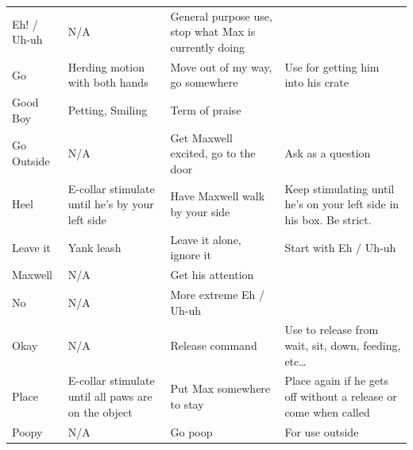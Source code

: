 \documentclass[pdftex,12pt]{article}
\begin{document}
\begin{table}[H]
\begin{adjustwidth}{-4.5cm}{-4.5cm}
\begin{center}
\begin{tabular}{lp{}p{}p{}}
                Eh! / Uh-uh & N/A                                              & General purpose use, stop what Max is currently doing &                                                                    \\
                Go          & Herding motion with both hands                   & Move out of my way, go somewhere                      & Use for getting him into his crate                                 \\
                Good Boy    & Petting, Smiling                                 & Term of praise                                        &                                                                    \\
                Go Outside  & N/A                                              & Get Maxwell excited, go to the door                   & Ask as a question                    \\
                Heel  & E-collar stimulate until he's by your left side & Have Maxwell walk by your side                  & Keep stimulating until he's on your left side in his box. Be strict.                    \\
                Leave it    & Yank leash                                       & Leave it alone, ignore it                             & Start with Eh / Uh-uh                                              \\
                Maxwell     & N/A                                              & Get his attention                                     &                                                                    \\
                No          & N/A                                              & More extreme Eh / Uh-uh                               &                                                                    \\
                Okay        & N/A                                              & Release
                command                                       & Use to release from
                wait, sit, down, feeding, etc\ldots                \\
                Place       & E-collar stimulate until all paws are on the
                object & Put Max somewhere to stay & Place again if he gets
                off without a release or come when called \\
                Poopy       & N/A                                              & Go poop                               & For use outside                                                    \\

\end{tabular}
\end{center}
\end{adjustwidth}
\end{table}
\end{document}
